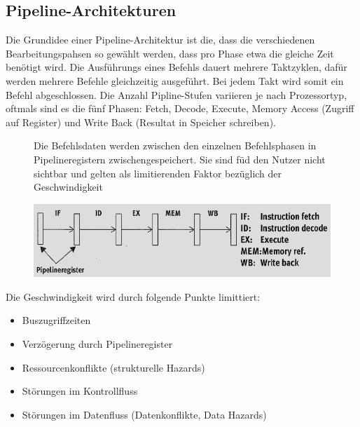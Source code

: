 \subsection{Pipeline-Architekturen}
Die Grundidee einer Pipeline-Architektur ist die, dass die verschiedenen Bearbeitungspahsen so gewählt werden, dass pro Phase etwa die gleiche Zeit benötigt wird.
Die Ausführungs eines Befehls dauert mehrere Taktzyklen, dafür werden mehrere Befehle gleichzeitig ausgeführt.
Bei jedem Takt wird somit ein Befehl abgeschlossen.
Die Anzahl Pipline-Stufen variieren je nach Prozessortyp, oftmals sind es die fünf Phasen: Fetch, Decode, Execute, Memory Access (Zugriff auf Register) und Write Back (Resultat in Speicher schreiben).
\begin{figure}[htbp]
	
	\begin{minipage}{0.5\textwidth}
		Die Befehlsdaten werden zwischen den einzelnen Befehlsphasen in Pipelineregistern zwischengespeichert. Sie sind füd den Nutzer nicht sichtbar und gelten als limitierenden Faktor bezüglich der Geschwindigkeit		
		
	\end{minipage}
	\hfill		
	\begin{minipage}{0.45\textwidth} 
		\includegraphics[width=\textwidth]{images/Rechnerarchitekturen/Pipeline.PNG}
	\end{minipage}
	
\end{figure}

Die Geschwindigkeit wird durch folgende Punkte limittiert:
\begin{itemize}[noitemsep,topsep=0pt]
	\item Buszugriffzeiten
	\item Verzögerung durch Pipelineregister
	\item Ressourcenkonflikte (strukturelle Hazards)
	\item Störungen im Kontrollfluss
	\item Störungen im Datenfluss (Datenkonflikte, Data Hazards)
\end{itemize}


